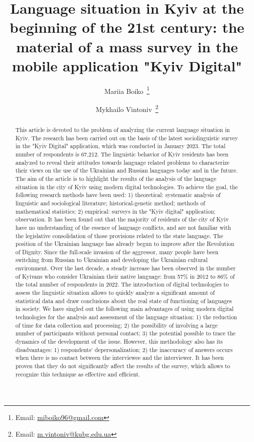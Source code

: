 \documentclass[english]{textolivre}
\title{Language situation in Kyiv at the beginning of the 21st century: the material of a mass survey in the mobile application "Kyiv Digital"}
\author[1]{Mariia Boiko~\orcid{0000-0001-9826-7464}\thanks{Email: \href{mailto:miboiko96@gmail.com}{miboiko96@gmail.com}}}
\author[1]{Mykhailo Vintoniv~\orcid{0000-0002-3258-8633}\thanks{Email: \href{mailto:m.vintoniv@kubg.edu.ua}{m.vintoniv@kubg.edu.ua}}}
\affil[1]{Faculty of Ukrainian Philology, Culture and Art Borys Grinchenko Kyiv University, Kyiv, Ukraine.}
\begin{document}
\maketitle

\begin{polyabstract}
 
\begin{english}
\begin{abstract}
This article is devoted to the problem of analyzing the current language situation in Kyiv. The research has been carried out on the basis of the latest sociolinguistic survey in the "Kyiv Digital" application, which was conducted in January 2023. The total number of respondents is 67,212. The linguistic behavior of Kyiv residents has been analyzed to reveal their attitudes towards language related problems to characterize their views on the use of the Ukrainian and Russian languages today and in the future. The aim of the article is to highlight the results of the analysis of the language situation in the city of Kyiv using modern digital technologies. To achieve the goal, the following research methods have been used: 1) theoretical: systematic analysis of linguistic and sociological literature; historical-genetic method; methods of mathematical statistics; 2) empirical: surveys in the "Kyiv digital" application; observation. It has been found out that the majority of residents of the city of Kyiv have no understanding of the essence of language conflicts, and are not familiar with the legislative consolidation of those provisions related to the state language. The position of the Ukrainian language has already begun to improve after the Revolution of Dignity. Since the full-scale invasion of the aggressor, many people have been switching from Russian to Ukrainian and developing the Ukrainian cultural environment. Over the last decade, a steady increase has been observed in the number of Kyivans who consider Ukrainian their native language: from 57\% in 2012 to 86\% of the total number of respondents in 2022. The introduction of digital technologies to assess the linguistic situation allows to quickly analyze a significant amount of statistical data and draw conclusions about the real state of functioning of languages in society. We have singled out the following main advantages of using modern digital technologies for the analysis and assessment of the language situation: 1) the reduction of time for data collection and processing; 2) the possibility of involving a large number of participants without personal contact; 3) the potential possible to trace the dynamics of the development of the issue. However, this methodology also has its disadvantages: 1) respondents` depersonalization; 2) the inaccuracy of answers occurs when there is no contact between the interviewee and the interviewer. It has been proven that they do not significantly affect the results of the survey, which allows to recognize this technique as effective and efficient.


\end{abstract}
\end{english}
\end{polyabstract}
\end{document}
